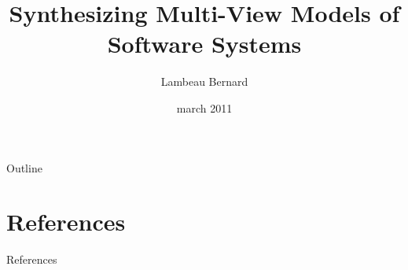 \documentclass[11pt]{beamer}
\title{Synthesizing Multi-View Models of Software Systems}
\author{Lambeau Bernard}
\institute{UCL/EPL/INGI}
\date{march 2011}
\begin{document}
\begin{frame}
    \titlepage
\end{frame}

\begin{frame}{Outline}
	\small
	\tableofcontents
\end{frame} 









\section{References}
\begin{frame}[allowframebreaks]{References}
	\tiny
	
	 
\end{frame}
\end{document}
